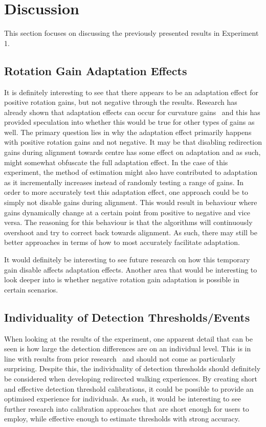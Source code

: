 \section{Discussion}
This section focuses on discussing the previously presented results in Experiment 1.

\subsection{Rotation Gain Adaptation Effects}
It is definitely interesting to see that there appears to be an adaptation effect for positive rotation gains, but not negative through the results. Research has already shown that adaptation effects can occur for curvature gains~\cite{bolling2019shrinking} and this has provided speculation into whether this would be true for other types of gains as well. The primary question lies in why the adaptation effect primarily happens with positive rotation gains and not negative. It may be that disabling redirection gains during alignment towards centre has some effect on adaptation and as such, might somewhat obfuscate the full adaptation effect. In the case of this experiment, the method of estimation might also have contributed to adaptation as it incrementally increases instead of randomly testing a range of gains. In order to more accurately test this adaptation effect, one approach could be to simply not disable gains during alignment. This would result in behaviour where gains dynamically change at a certain point from positive to negative and vice versa. The reasoning for this behaviour is that the algorithms will continuously overshoot and try to correct back towards alignment. As such, there may still be better approaches in terms of how to most accurately facilitate adaptation. 

It would definitely be interesting to see future research on how this temporary gain disable affects adaptation effects. Another area that would be interesting to look deeper into is whether negative rotation gain adaptation is possible in certain scenarios. 

\subsection{Individuality of Detection Thresholds/Events}
When looking at the results of the experiment, one apparent detail that can be seen is how large the detection differences are on an individual level. This is in line with results from prior research~\cite{8446225, nguyen2018individual, schmitz2018you, fuglestad2018redirected} and should not come as particularly surprising. Despite this, the individuality of detection thresholds should definitely be considered when developing redirected walking experiences. By creating short and effective detection threshold calibrations, it could be possible to provide an optimised experience for individuals. As such, it would be interesting to see further research into calibration approaches that are short enough for users to employ, while effective enough to estimate thresholds with strong accuracy. 

